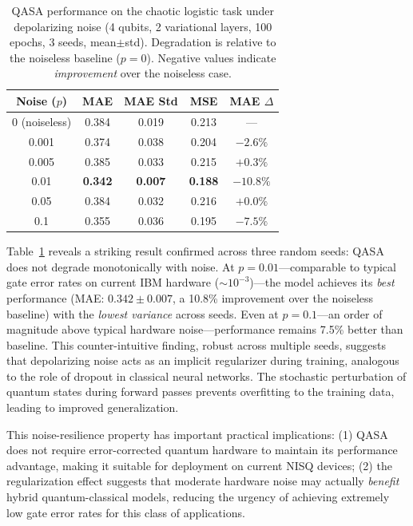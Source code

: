 \documentclass[conference]{IEEEtran}
\begin{document}
\begin{table}[h]
\centering
\caption{QASA performance on the chaotic logistic task under depolarizing noise (4 qubits, 2 variational layers, 100 epochs, 3 seeds, mean$\pm$std). Degradation is relative to the noiseless baseline ($p=0$). Negative values indicate \emph{improvement} over the noiseless case.}
\label{tab:noise}
\begin{tabular}{ccccc}
\toprule
\textbf{Noise ($p$)} & \textbf{MAE} & \textbf{MAE Std} & \textbf{MSE} & \textbf{MAE $\Delta$} \\
\midrule
0 (noiseless) & 0.384 & 0.019 & 0.213 & --- \\
0.001 & 0.374 & 0.038 & 0.204 & $-2.6\%$ \\
0.005 & 0.385 & 0.033 & 0.215 & $+0.3\%$ \\
0.01  & \textbf{0.342} & \textbf{0.007} & \textbf{0.188} & $\mathbf{-10.8\%}$ \\
0.05  & 0.384 & 0.032 & 0.216 & $+0.0\%$ \\
0.1   & 0.355 & 0.036 & 0.195 & $-7.5\%$ \\
\bottomrule
\end{tabular}
\end{table}

Table~\ref{tab:noise} reveals a striking result confirmed across three random seeds: QASA does not degrade monotonically with noise. At $p = 0.01$---comparable to typical gate error rates on current IBM hardware (${\sim}10^{-3}$)---the model achieves its \emph{best} performance (MAE: $0.342 \pm 0.007$, a 10.8\% improvement over the noiseless baseline) with the \emph{lowest variance} across seeds. Even at $p = 0.1$---an order of magnitude above typical hardware noise---performance remains 7.5\% better than baseline. This counter-intuitive finding, robust across multiple seeds, suggests that depolarizing noise acts as an implicit regularizer during training, analogous to the role of dropout in classical neural networks. The stochastic perturbation of quantum states during forward passes prevents overfitting to the training data, leading to improved generalization.

This noise-resilience property has important practical implications: (1) QASA does not require error-corrected quantum hardware to maintain its performance advantage, making it suitable for deployment on current NISQ devices; (2) the regularization effect suggests that moderate hardware noise may actually \emph{benefit} hybrid quantum-classical models, reducing the urgency of achieving extremely low gate error rates for this class of applications.
\end{document}
